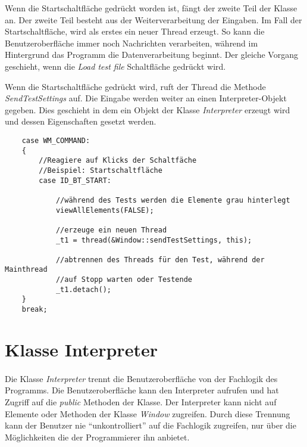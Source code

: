 Wenn die Startschaltfläche gedrückt worden ist, fängt der zweite Teil der Klasse an. Der zweite Teil besteht aus der Weiterverarbeitung der Eingaben. Im Fall der Startschaltfläche, wird als erstes ein neuer Thread erzeugt. So kann die Benutzeroberfläche immer noch Nachrichten verarbeiten, während im Hintergrund das Programm die Datenverarbeitung beginnt. Der gleiche Vorgang geschieht, wenn die \textit{Load test file} Schaltfläche gedrückt wird.\\

\newpage

Wenn die Startschaltfläche gedrückt wird, ruft der Thread die Methode \textit{SendTestSettings} auf. Die Eingabe werden weiter an einen Interpreter-Objekt gegeben. Dies geschieht in dem ein Objekt der Klasse \textit{Interpreter} erzeugt wird und dessen Eigenschaften gesetzt werden.

\begin{lstlisting}	 
	case WM_COMMAND:
	{
		//Reagiere auf Klicks der Schaltfäche
		//Beispiel: Startschaltfläche
		case ID_BT_START:

			//während des Tests werden die Elemente grau hinterlegt
			viewAllElements(FALSE);

			//erzeuge ein neuen Thread
			_t1 = thread(&Window::sendTestSettings, this);

			//abtrennen des Threads für den Test, während der Mainthread
			//auf Stopp warten oder Testende
			_t1.detach();
	}
    break;
\end{lstlisting}




\newpage

\section{Klasse Interpreter}
\paragraph{}
Die Klasse \textit{Interpreter} trennt die Benutzeroberfläche von der Fachlogik des Programms. Die Benutzeroberfläche kann den Interpreter aufrufen und hat Zugriff auf die \textit{public} Methoden der Klasse. Der Interpreter kann nicht auf Elemente oder Methoden der Klasse \textit{Window} zugreifen. Durch diese Trennung kann der Benutzer nie "`unkontrolliert"' auf die Fachlogik zugreifen, nur über die Möglichkeiten die der Programmierer ihn anbietet.\\

